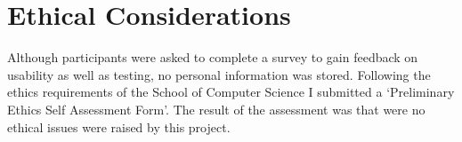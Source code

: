 \section{Ethical Considerations}
\label{Ethical_Considerations}
Although participants were asked to complete a survey to gain feedback on  usability as well as testing, no personal information was stored. Following the  ethics requirements of the School of Computer Science I submitted a ‘Preliminary Ethics Self Assessment Form’. The result of the assessment was that were no  ethical issues were raised by this project.



% 	
% 	
